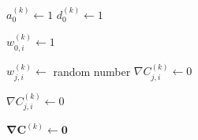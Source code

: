 \documentclass[titlepage]{article}
\begin{document}
      \begin{algorithm}
        \caption{%
          Initialize the network with random weights and biases.
        } \label{alginit}
        \begin{algorithmic}
              \State $a_0^{(k)} \gets 1$
              \State $d_0^{(k)} \gets 1$
            \EndFor

                \State $w_{0,i}^{(k)} \gets 1$

                  \State $w_{j,i}^{(k)} \gets$ random number
                  \State $\nabla C_{j,i}^{(k)} \gets 0$
                \EndFor
              \EndFor
            \EndFor
          \EndProcedure
        \end{algorithmic}
      \end{algorithm}

      \begin{algorithm}
        \caption{%
          Initialize the gradient that belongs to the current batch.
        } \label{algcleargrad}
        \begin{algorithmic}
                  \State $\nabla C_{j,i}^{(k)} \gets 0$
                \EndFor
              \EndFor
            \EndFor
          \EndProcedure
        \end{algorithmic}
      \end{algorithm}

      \begin{algorithm}
        \caption{%
          Algorithm \ref{algcleargrad} with matrix-vector notation.
        } \label{algcleargrad}
        \begin{algorithmic}
              \State $\mathbf{\nabla C}^{(k)} \gets \mathbf{0}$
            \EndFor
          \EndProcedure
        \end{algorithmic}
      \end{algorithm}
\end{document}
